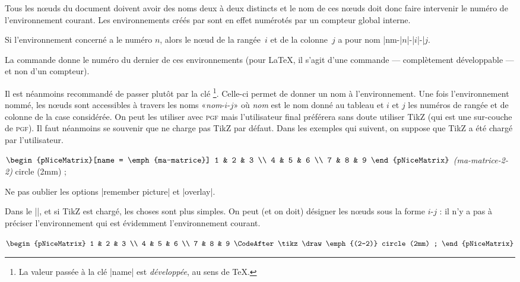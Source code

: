 \documentclass[dvipsnames]{article}
\begin{document}
\medskip
Tous les nœuds du document doivent avoir des noms deux à deux distincts et le
nom de ces nœuds doit donc faire intervenir le numéro de l'environnement
courant. Les environnements créés par  sont en effet numérotés
par un compteur global interne.

\smallskip
Si l'environnement concerné a le numéro $n$, alors le nœud de la rangée~$i$ et
de la colonne~$j$ a pour nom |nm-|$n$|-|$i$|-|$j$.

\smallskip
{}
La commande  donne le numéro du dernier de
ces environnements (pour LaTeX, il s'agit d'une commande — complètement
développable — et non d'un compteur).

\smallskip
{}
Il est néanmoins recommandé de passer plutôt par la clé \footnote{La
  valeur passée à la clé |name| est \emph{développée}, au sens de TeX.}.
Celle-ci permet de donner un nom à l'environnement. Une fois l'environnement
nommé, les nœuds sont accessibles à travers les noms «\textsl{nom}-$i$-$j$» où
\textsl{nom} est le nom donné au tableau et $i$ et $j$ les numéros de rangée et
de colonne de la case considérée. On peut les utiliser avec \textsc{pgf} mais
l'utilisateur final préférera sans doute utiliser TikZ (qui est une sur-couche
de \textsc{pgf}). Il faut néanmoins se souvenir que  ne charge
pas TikZ par défaut. Dans les exemples qui suivent, on suppose que TikZ a été
chargé par l'utilisateur.

\medskip
\begin{Code}[width=11cm,show-output]
$\begin{pNiceMatrix}[name = \emph{ma-matrice}]
  1 & 2 & 3 \\
  4 & 5 & 6 \\
  7 & 8 & 9
\end{pNiceMatrix}$
     \draw \emph{(ma-matrice-2-2)} circle (2mm) ;
\end{Code}

\medskip
Ne pas oublier les options |remember picture| et |overlay|.


\medskip
Dans le |\CodeAfter|, et si TikZ est chargé, les choses sont plus simples. On
peut (et on doit) désigner les nœuds sous la forme $i$-$j$ : il n'y a pas à
préciser l'environnement qui est évidemment l'environnement courant.


\medskip
\begin{Code}[width=11cm,show-output]
$\begin{pNiceMatrix}
  1 & 2 & 3 \\
  4 & 5 & 6 \\
  7 & 8 & 9
\CodeAfter
  \tikz \draw \emph{(2-2)} circle (2mm) ;
\end{pNiceMatrix}$
\end{Code}
\end{document}
